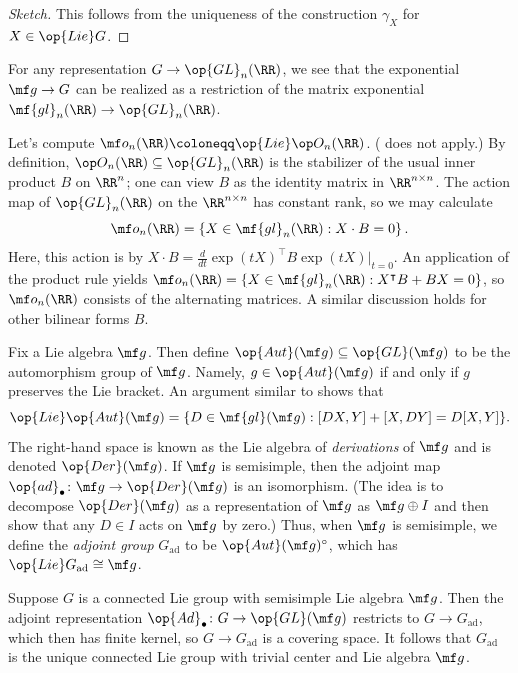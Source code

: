 \documentclass{article}
\begin{document}
\begin{proof}[Sketch]
	This follows from the uniqueness of the construction $\gamma_X$ for $X\in\op{Lie}G$.
\end{proof}
\begin{example}
	For any representation $G\to\op{GL}_n(\RR)$, we see that the exponential $\mf g\to G$ can be realized as a restriction of the matrix exponential $\mf{gl}_n(\RR)\to\op{GL}_n(\RR)$.
\end{example}
\begin{example} \label{ex:lie-orthogonal}
	Let's compute $\mf o_n(\RR)\coloneqq\op{Lie}\op O_n(\RR)$. ( does not apply.) By definition, $\op O_n(\RR)\subseteq\op{GL}_n(\RR)$ is the stabilizer of the usual inner product $B$ on $\RR^n$; one can view $B$ as the identity matrix in $\RR^{n\times n}$. The action map of $\op{GL}_n(\RR)$ on the $\RR^{n\times n}$ has constant rank, so we may calculate
	\[\mf o_n(\RR)=\left\{X\in\mf{gl}_n(\RR):X\cdot B=0\right\}.\]
	Here, this action is by $X\cdot B=\frac d{dt}\exp(tX)^\intercal B\exp(tX)\big|_{t=0}$. An application of the product rule yields $\mf o_n(\RR)=\{X\in\mf{gl}_n(\RR):X^\intercal B+BX=0\}$, so $\mf o_n(\RR)$ consists of the alternating matrices. A similar discussion holds for other bilinear forms $B$.
\end{example}
\begin{example} \label{ex:adjoint}
	Fix a Lie algebra $\mf g$. Then define $\op{Aut}(\mf g)\subseteq\op{GL}(\mf g)$ to be the automorphism group of $\mf g$. Namely, $g\in\op{Aut}(\mf g)$ if and only if $g$ preserves the Lie bracket. An argument similar to  shows that
	\[\op{Lie}\op{Aut}(\mf g)=\{D\in\mf{gl}(\mf g):[DX,Y]+[X,DY]=D[X,Y]\}.\]
	The right-hand space is known as the Lie algebra of \textit{derivations} of $\mf g$ and is denoted $\op{Der}(\mf g)$. If $\mf g$ is semisimple, then the adjoint map $\op{ad}_\bullet\colon\mf g\to\op{Der}(\mf g)$ is an isomorphism. (The idea is to decompose $\op{Der}(\mf g)$ as a representation of $\mf g$ as $\mf g\oplus I$ and then show that any $D\in I$ acts on $\mf g$ by zero.) Thus, when $\mf g$ is semisimple, we define the \textit{adjoint group} $G_{\mathrm{ad}}$ to be $\op{Aut}(\mf g)^\circ$, which has $\op{Lie}G_{\mathrm{ad}}\cong\mf g$.
\end{example}
\begin{remark}
	Suppose $G$ is a connected Lie group with semisimple Lie algebra $\mf g$. Then the adjoint representation $\op{Ad}_\bullet\colon G\to\op{GL}(\mf g)$ restricts to $G\to G_{\mathrm{ad}}$, which then has finite kernel, so $G\to G_{\mathrm{ad}}$ is a covering space. It follows that $G_{\mathrm{ad}}$ is the unique connected Lie group with trivial center and Lie algebra $\mf g$.
\end{remark}
\end{document}
